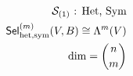 \documentclass[preview]{standalone}
\begin{document}
\begin{align*}
\special{dvisvgm:raw <g id='unique000'>}\mathcal{S}_{(1)}\text{ : Het, Sym}\\\mathsf{Sel}_{\text{het,sym}}^{(m)}(V,B)\cong\Lambda^m(V)\\\dim = \binom{n}{m}\special{dvisvgm:raw </g>}
\end{align*}
\end{document}
